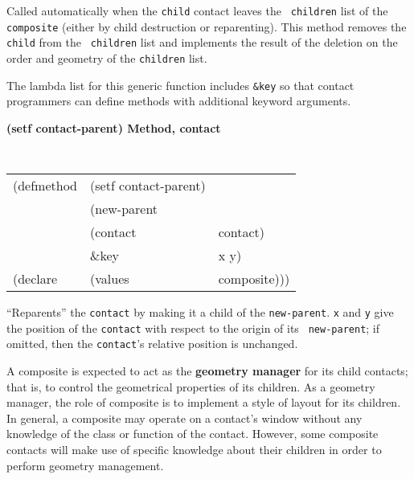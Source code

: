 \begin{flushright} \parbox[t]{6.125in}{
Called automatically when the {\tt child} contact leaves the {\tt
children} list of the {\tt composite} (either by child destruction or
reparenting). This method  removes the {\tt child} from the {\tt
children} list and implements the result of the deletion on the order and
geometry of the {\tt children} list.

The lambda list for this generic function includes {\tt \&key} so that contact
programmers can define methods with additional keyword arguments.
}\end{flushright}

{\samepage
{\large {\bf (setf contact-parent) \hfill Method, contact}}
\begin{flushright} \parbox[t]{6.125in}{
\tt
\begin{tabular}{lll}
\raggedright
(defmethod & (setf contact-parent) & \\
& (new-parent\\
&  (contact  &contact)\\
&  \&key & x y) \\
(declare &(values & composite)))
\end{tabular}
\rm

}\end{flushright}}

\begin{flushright} \parbox[t]{6.125in}{
``Reparents'' the {\tt contact} by making it
a child of the {\tt new-parent}. {\tt x} and {\tt y} give 
the position of the {\tt contact} with respect to the origin of its {\tt
new-parent}; if omitted, then the {\tt contact}'s relative position is
unchanged. 

}\end{flushright}



A composite is expected to act as the {\bf geometry manager}
for its child contacts; that is, to control
the geometrical properties of its children. As a geometry manager, the role of composite
is to
implement a style of layout for its children. In general, a
composite may operate on a contact's window without any knowledge of the class
or function of the contact. However, some composite contacts will make use of
specific knowledge about their children in order to perform geometry management.

